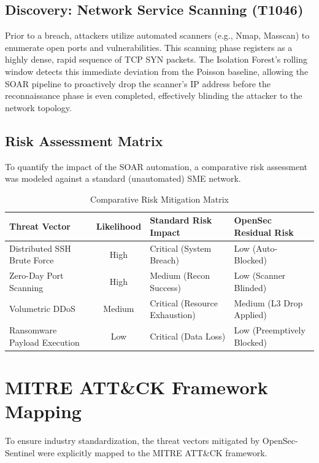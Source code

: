 \documentclass[12pt, a4paper]{report}
\begin{document}
	\subsection{Discovery: Network Service Scanning (T1046)}
	Prior to a breach, attackers utilize automated scanners (e.g., Nmap, Masscan) to enumerate open ports and vulnerabilities. This scanning phase registers as a highly dense, rapid sequence of TCP SYN packets. The Isolation Forest's rolling window detects this immediate deviation from the Poisson baseline, allowing the SOAR pipeline to proactively drop the scanner's IP address before the reconnaissance phase is even completed, effectively blinding the attacker to the network topology.
	
	\subsection{Risk Assessment Matrix}
	To quantify the impact of the SOAR automation, a comparative risk assessment was modeled against a standard (unautomated) SME network.
	
	\begin{table}[H]
		\centering
		\caption{Comparative Risk Mitigation Matrix}
		\vspace{0.2cm}
		\begin{tabularx}{\textwidth}{|>{\raggedright\arraybackslash}X|c|>{\raggedright\arraybackslash}X|>{\raggedright\arraybackslash}X|}
			\hline
			\textbf{Threat Vector} & \textbf{Likelihood} & \textbf{Standard Risk Impact} & \textbf{OpenSec Residual Risk} \\
			\hline
			Distributed SSH Brute Force & High & Critical (System Breach) & Low (Auto-Blocked) \\
			\hline
			Zero-Day Port Scanning & High & Medium (Recon Success) & Low (Scanner Blinded) \\
			\hline
			Volumetric DDoS & Medium & Critical (Resource Exhaustion) & Medium (L3 Drop Applied) \\
			\hline
			Ransomware Payload Execution & Low & Critical (Data Loss) & Low (Preemptively Blocked) \\
			\hline
		\end{tabularx}
	\end{table}
	
	\section{MITRE ATT\&CK Framework Mapping}
	To ensure industry standardization, the threat vectors mitigated by OpenSec-Sentinel were explicitly mapped to the MITRE ATT\&CK framework.
	
\end{document}
